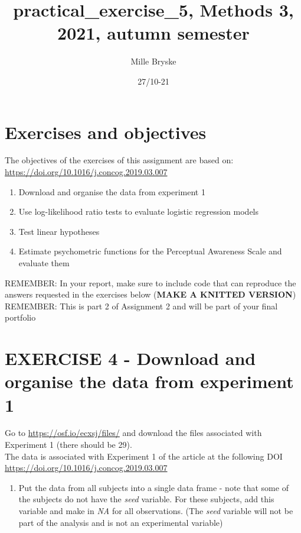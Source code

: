 \documentclass[
]{article}
\title{practical\_exercise\_5, Methods 3, 2021, autumn semester}
\author{Mille Bryske}
\date{27/10-21}
\providecommand{\tightlist}{%
  \setlength{\itemsep}{0pt}\setlength{\parskip}{0pt}}
\begin{document}
\maketitle

\hypertarget{exercises-and-objectives}{%
\section{Exercises and objectives}\label{exercises-and-objectives}}

The objectives of the exercises of this assignment are based on:
\url{https://doi.org/10.1016/j.concog.2019.03.007}

\begin{enumerate}
\def\labelenumi{\arabic{enumi})}
\setcounter{enumi}{3}
\tightlist
\item
  Download and organise the data from experiment 1\\
\item
  Use log-likelihood ratio tests to evaluate logistic regression
  models\\
\item
  Test linear hypotheses\\
\item
  Estimate psychometric functions for the Perceptual Awareness Scale and
  evaluate them
\end{enumerate}

REMEMBER: In your report, make sure to include code that can reproduce
the answers requested in the exercises below (\textbf{MAKE A KNITTED
VERSION})\\
REMEMBER: This is part 2 of Assignment 2 and will be part of your final
portfolio

\hypertarget{exercise-4---download-and-organise-the-data-from-experiment-1}{%
\section{EXERCISE 4 - Download and organise the data from experiment
1}\label{exercise-4---download-and-organise-the-data-from-experiment-1}}

Go to \url{https://osf.io/ecxsj/files/} and download the files
associated with Experiment 1 (there should be 29).\\
The data is associated with Experiment 1 of the article at the following
DOI \url{https://doi.org/10.1016/j.concog.2019.03.007}

\begin{enumerate}
\def\labelenumi{\arabic{enumi})}
\tightlist
\item
  Put the data from all subjects into a single data frame - note that
  some of the subjects do not have the \emph{seed} variable. For these
  subjects, add this variable and make in \emph{NA} for all
  observations. (The \emph{seed} variable will not be part of the
  analysis and is not an experimental variable)
\end{enumerate}
\end{document}
